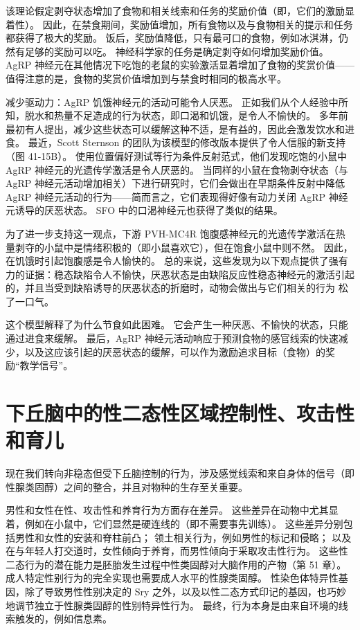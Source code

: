 该理论假定剥夺状态增加了食物和相关线索和任务的奖励价值（即，它们的激励显着性）。 因此，在禁食期间，奖励值增加，所有食物以及与食物相关的提示和任务都获得了极大的奖励。 饭后，奖励值降低，只有最可口的食物，例如冰淇淋，仍然有足够的奖励可以吃。 神经科学家的任务是确定剥夺如何增加奖励价值。 AgRP 神经元在其他情况下吃饱的老鼠的实验激活显着增加了食物的奖赏价值——值得注意的是，食物的奖赏价值增加到与禁食时相同的极高水平。

减少驱动力：AgRP 饥饿神经元的活动可能令人厌恶。 正如我们从个人经验中所知，脱水和热量不足造成的行为状态，即口渴和饥饿，是令人不愉快的。 多年前最初有人提出，减少这些状态可以缓解这种不适，是有益的，因此会激发饮水和进食。 最近，Scott Sternson 的团队为该模型的修改版本提供了令人信服的新支持（图 41-15B）。 使用位置偏好测试等行为条件反射范式，他们发现吃饱的小鼠中 AgRP 神经元的光遗传学激活是令人厌恶的。 当同样的小鼠在食物剥夺状态（与 AgRP 神经元活动增加相关）下进行研究时，它们会做出在早期条件反射中降低 AgRP 神经元活动的行为——简而言之，它们表现得好像有动力关闭 AgRP 神经元诱导的厌恶状态。 SFO 中的口渴神经元也获得了类似的结果。

为了进一步支持这一观点，下游 PVH-MC4R 饱腹感神经元的光遗传学激活在热量剥夺的小鼠中是情绪积极的（即小鼠喜欢它），但在饱食小鼠中则不然。 因此，在饥饿时引起饱腹感是令人愉快的。 总的来说，这些发现为以下观点提供了强有力的证据：稳态缺陷令人不愉快，厌恶状态是由缺陷反应性稳态神经元的激活引起的，并且当受到缺陷诱导的厌恶状态的折磨时，动物会做出与它们相关的行为 松了一口气。

这个模型解释了为什么节食如此困难。 它会产生一种厌恶、不愉快的状态，只能通过进食来缓解。 最后，AgRP 神经元活动响应于预测食物的感官线索的快速减少，以及这应该引起的厌恶状态的缓解，可以作为激励追求目标（食物）的奖励“教学信号”。


\section{下丘脑中的性二态性区域控制性、攻击性和育儿}
现在我们转向非稳态但受下丘脑控制的行为，涉及感觉线索和来自身体的信号（即性腺类固醇）之间的整合，并且对物种的生存至关重要。

男性和女性在性、攻击性和养育行为方面存在差异。 这些差异在动物中尤其显着，例如在小鼠中，它们显然是硬连线的（即不需要事先训练）。 这些差异分别包括男性和女性的安装和脊柱前凸； 领土相关行为，例如男性的标记和侵略； 以及在与年轻人打交道时，女性倾向于养育，而男性倾向于采取攻击性行为。 这些性二态行为的潜在能力是胚胎发生过程中性类固醇对大脑作用的产物（第 51 章）。 成人特定性别行为的完全实现也需要成人水平的性腺类固醇。 性染色体特异性基因，除了导致男性性别决定的 Sry 之外，以及以性二态方式印记的基因，也巧妙地调节独立于性腺类固醇的性别特异性行为。 最终，行为本身是由来自环境的线索触发的，例如信息素。

